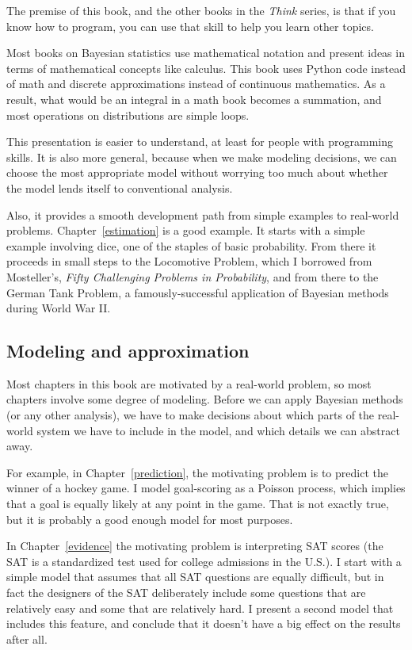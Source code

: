 \documentclass[12pt]{book}
\begin{document}
The premise of this book, and the other books in the {\it Think}
series, is that if you know how to program, you
can use that skill to help you learn other topics.

Most books on Bayesian statistics use mathematical notation and
present ideas in terms of mathematical concepts like calculus.
This book uses Python code instead of math and discrete approximations
instead of continuous mathematics.  As a result, what would
be an integral in a math book becomes a summation, and
most operations on distributions are simple loops.

This presentation is easier to understand, at least for people with
programming skills.  It is also more general, because when we make
modeling decisions, we can choose the most appropriate model without
worrying too much about whether the model lends itself to conventional
analysis.

Also, it provides a smooth development path from
simple examples to real-world problems.  Chapter~\ref{estimation} is a
good example.  It starts with a simple example involving dice, one of
the staples of basic probability.  From there it proceeds in small
steps to the Locomotive Problem, which I borrowed from Mosteller's,
{\it Fifty Challenging Problems in Probability}, and from there to the
German Tank Problem, a famously-successful application of Bayesian
methods during World War II.


\subsection{Modeling and approximation}

Most chapters in this book are motivated by a real-world problem,
so most chapters involve some degree of modeling.   Before we
can apply Bayesian methods (or any other analysis), we have to
make decisions about which parts of the real-world system we
have to include in the model, and which details we can abstract
away.

For example, in Chapter~\ref{prediction}, the motivating problem is to
predict the winner of a hockey game.  I model goal-scoring as a
Poisson process, which implies that a goal is equally likely at any
point in the game.  That is not exactly true, but it is probably a
good enough model for most purposes.

In Chapter~\ref{evidence} the motivating problem is interpreting SAT
scores (the SAT is a standardized test used for college admissions in
the U.S.).  I start with a simple model that assumes that all SAT
questions are equally difficult, but in fact the designers of the SAT
deliberately include some questions that are relatively easy and some
that are relatively hard.  I present a second model that includes this
feature, and conclude that it doesn't have a big effect on the results
after all.
\end{document}
